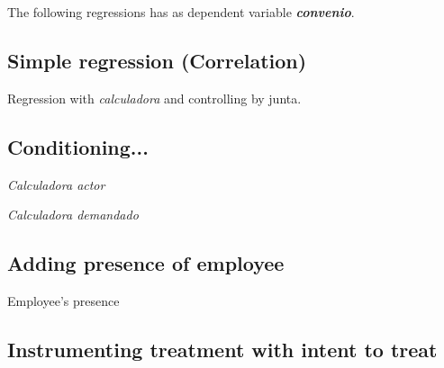 \documentclass[12pt]{article}
\theoremstyle{named}
\newcommand{\folder}{./Effect}
\begin{document}
The following regressions has as dependent variable \emph{\textbf{convenio}}.\\



\subsection*{Simple regression (Correlation)}

\begin{table}[H]\centering \caption{Regression with \emph{calculadora} and controlling by junta.}
\begin{center}
\scriptsize{}
\end{center}
\end{table}

\subsection*{Conditioning...}

\begin{table}[H]\centering \caption{\emph{Calculadora actor}}
\begin{center}
\scriptsize{}
\end{center}
\end{table}

\begin{table}[H]\centering \caption{\emph{Calculadora demandado}}
\begin{center}
\scriptsize{}
\end{center}
\end{table}


\subsection*{Adding presence of employee}

\begin{table}[H]\centering \caption{Employee's presence}
\begin{center}
\scriptsize{}
\end{center}
\end{table}

\subsection*{Instrumenting treatment with intent to treat}
\end{document}
